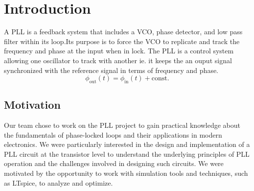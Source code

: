 
\pagestyle{fancy}
\fancyhf{}


\pagestyle{fancy}
\fancyhf{} %
\fancyhead[R]{\makebox[\textwidth][r]{\textbf{\nouppercase{\leftmark}}}} %

\renewcommand{\footrulewidth}{0.4pt}
\chapter{Introduction}
 A PLL is a feedback system that includes a VCO, phase detector, and low pass filter within its loop.Its purpose is to force the VCO to replicate and track the frequency and phase at the input when in lock. The PLL is a control system allowing one oscillator to track with another ie. it keeps the an ouput signal synchronized with the reference signal in terms of frequency and phase.
\begin{equation}
    \label{eq:pll_1}
    \phi_{\text{out}}(t) = \phi_{\text{in}}(t) + \text{const.}
\end{equation}

\section{Motivation}
Our team chose to work on the PLL project to gain practical knowledge about the fundamentals of phase-locked loops and their applications in modern electronics. We were particularly interested in the design and implementation of a PLL circuit at the transistor level to understand the underlying principles of PLL operation and the challenges involved in designing such circuits. We were motivated by the opportunity to work with simulation tools and techniques, such as LTspice, to analyze and optimize.

